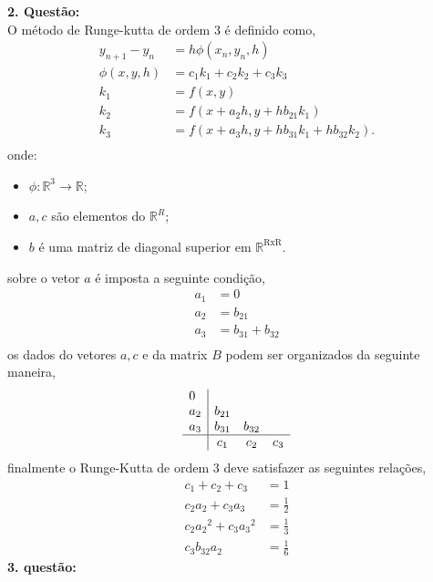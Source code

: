 \documentclass[a4paper,12pt]{article}
\begin{document}
\textbf{2. Quest\~ao:}\\
O m\'etodo de Runge-kutta de ordem 3 \'e definido como,\\
\begin{align*}
	y_{n+1} - y_{n} &= h\phi(x_{n},y_{n},h)\\
	\phi (x,y,h) &= {c_1}{k_1} + {c_2}{k_2} + {c_3}{k_3}\\
	k_1 &= f(x,y)\\ 
	k_2 &= f(x + a_2 h,y + hb_{21}{k_1})\\ 
	k_3 &= f(x + a_3 h,y + hb_{31}{k_1} + hb_{32}{k_2}).\\ 
\end{align*}
onde:\\
\begin{itemize}
	\item $\phi :\mathbb{R}^{3} \rightarrow \mathbb{R}$;
	\item $a,c$ s\~ao elementos do $\mathbb{R}^{R}$; 
	\item $b$ \'e uma matriz de diagonal superior em $\mathbb{R}^{\mathrm{RxR}}$.
\end{itemize}
sobre o vetor $a$ \'e imposta a seguinte condi\c c\~ao,
\begin{align*}
	a_1 &= 0\\
	a_2 &= b_{21}\\
	a_3 &= b_{31} + b_{32}\\
\end{align*}
os dados do vetores $a, c$ e da matrix $B$ podem ser organizados da seguinte maneira,
{\arraycolsep=3.4pt\def\arraystretch{1.4}
\[
	\begin{array}{l|ccc} 
		0 &  & & \\
		a_2 & b_{21} & & \\
		a_3 & b_{31} & b_{32}& \\
		\hline
		&c_1 & c_2 & c_3
	\end{array}
\]
}
finalmente o Runge-Kutta de ordem 3 deve satisfazer as seguintes rela\c c\~oes,
\begin{align*}
	c_1 + c_2 + c_3 &= 1 \\
	c_2 a_2 + c_3 a_3 &= \frac{1}{2} \\
	c_2 {a_2}^{2} + c_3 {a_3}^{2}&= \frac{1}{3} \\
	c_3 b_{32} a_2 &= \frac{1}{6}
\end{align*}
\textbf{3. quest\~ao:}\\
\end{document}
